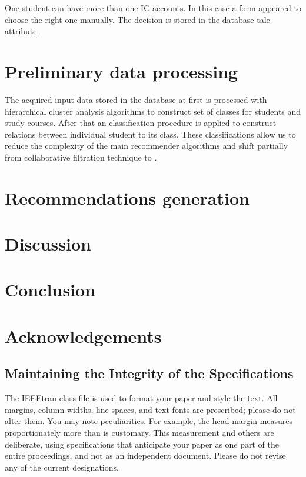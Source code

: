 \documentclass[conference]{IEEEtran}
\begin{document}

One student can have more than one IC accounts.  In this case a form appeared to choose the right one manually.  The decision is stored in the database tale attribute.


\section{Preliminary data processing}
\label{sec:relim-proc}

The acquired input data stored in the database at first is processed with hierarchical cluster analysis algorithms to construct set of classes for students and study courses.  After that an classification procedure is applied to construct relations between individual student to its class.  These classifications allow us to reduce the complexity of the main recommender algorithms and shift partially from collaborative filtration technique to .


\section{Recommendations generation}
\label{sec:proc-recs}


\section{Discussion}
\label{sec:disc}

\section*{Conclusion}
\label{sec:conc}



\section*{Acknowledgements}
\label{sec:ack}



\subsection{Maintaining the Integrity of the Specifications}

The IEEEtran class file is used to format your paper and style the text. All margins,
column widths, line spaces, and text fonts are prescribed; please do not
alter them. You may note peculiarities. For example, the head margin
measures proportionately more than is customary. This measurement
and others are deliberate, using specifications that anticipate your paper
as one part of the entire proceedings, and not as an independent document.
Please do not revise any of the current designations.
\end{document}
